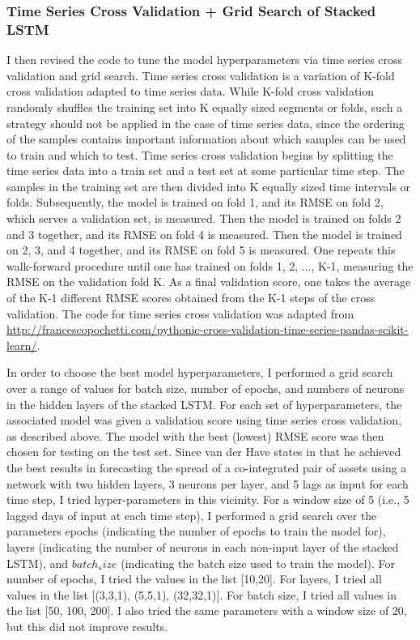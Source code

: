 \documentclass{article}
\begin{document}
\subsubsection{Time Series Cross Validation + Grid Search of Stacked LSTM}

I then revised the code to tune the model hyperparameters via time series cross validation and grid search. Time series cross validation is a variation of K-fold cross validation adapted to time series data. While K-fold cross validation randomly shuffles the training set into K equally sized segments or folds, such a strategy should not be applied in the case of time series data, since the ordering of the samples contains important information about which samples can be used to train and which to test. Time series cross validation begins by splitting the time series data into a train set and a test set at some particular time step. The samples in the training set are then divided into K equally sized time intervals or folds. Subsequently, the model is trained on fold 1, and its RMSE on fold 2, which serves a validation set, is measured. Then the model is trained on folds 2 and 3 together, and its RMSE on fold 4 is measured. Then the model is trained on 2, 3, and 4 together, and its RMSE on fold 5 is measured. One repeats this walk-forward procedure until one has trained on folds 1, 2, ..., K-1, measuring the RMSE on the validation fold K. As a final validation score, one takes the average of the K-1 different RMSE scores obtained from the K-1 steps of the cross validation. The code for time series cross validation was adapted from \url{http://francescopochetti.com/pythonic-cross-validation-time-series-pandas-scikit-learn/}. 

In order to choose the best model hyperparameters, I performed a grid search over a range of values for batch size, number of epochs, and numbers of neurons in the hidden layers of the stacked LSTM. For each set of hyperparameters, the associated model was given a validation score using time series cross validation, as described above. The model with the best (lowest) RMSE score was then chosen for testing on the test set.  Since van der Have states in \cite{van2017pairs} that he achieved the best results in forecasting the spread of a co-integrated pair of assets using a network with two hidden layers, 3 neurons per layer, and 5 lags as input for each time step, I tried hyper-parameters in this vicinity. For a window size  of 5 (i.e., 5 lagged days of input at each time step), I performed a grid search over the parameters epochs (indicating the number of epochs to train the model for), layers (indicating the number of neurons in each non-input layer of the stacked LSTM), and $batch_size$ (indicating the batch size used to train the model). For number of epochs, I tried the values in the list [10,20]. For layers, I tried all values in the list [(3,3,1), (5,5,1), (32,32,1)]. For batch size, I tried all values in the list [50, 100, 200]. I also tried the same parameters with a window size of 20, but this did not improve results. 
\end{document}
